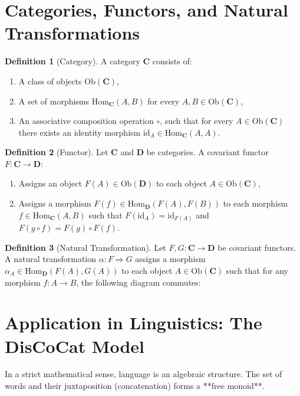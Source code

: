 \documentclass[11pt,a4paper,oneside]{book}
\theoremstyle{definition}
\newtheorem{definition}{Definition}[chapter]
\theoremstyle{plain}
\newcommand{\Cat}[1]{\mathbf{#1}}
\newcommand{\Hom}{\text{Hom}}
\newcommand{\id}{\text{id}}
\begin{document}
\section{Categories, Functors, and Natural Transformations}

\begin{definition}[Category]
A category $\Cat{C}$ consists of:
\begin{enumerate}
    \item A class of objects $\text{Ob}(\Cat{C})$,
    \item A set of morphisms $\Hom_{\Cat{C}}(A, B)$ for every $A, B \in \text{Ob}(\Cat{C})$,
    \item An associative composition operation $\circ$, such that for every $A \in \text{Ob}(\Cat{C})$ there exists an identity morphism $\id_A \in \Hom_{\Cat{C}}(A, A)$.
\end{enumerate}
\end{definition}

\begin{definition}[Functor]
Let $\Cat{C}$ and $\Cat{D}$ be categories. A covariant functor $F: \Cat{C} \to \Cat{D}$:
\begin{enumerate}
    \item Assigns an object $F(A) \in \text{Ob}(\Cat{D})$ to each object $A \in \text{Ob}(\Cat{C})$,
    \item Assigns a morphism $F(f) \in \Hom_{\Cat{D}}(F(A), F(B))$ to each morphism $f \in \Hom_{\Cat{C}}(A, B)$ such that $F(\id_A) = \id_{F(A)}$ and $F(g \circ f) = F(g) \circ F(f)$.
\end{enumerate}
\end{definition}

\begin{definition}[Natural Transformation]
Let $F, G: \Cat{C} \to \Cat{D}$ be covariant functors. A natural transformation $\alpha: F \Rightarrow G$ assigns a morphism $\alpha_A \in \Hom_{\Cat{D}}(F(A), G(A))$ to each object $A \in \text{Ob}(\Cat{C})$ such that for any morphism $f: A \to B$, the following diagram commutes:
\begin{center}
\end{center}
\end{definition}

\section{Application in Linguistics: The DisCoCat Model}
In a strict mathematical sense, language is an algebraic structure. The set of words and their juxtaposition (concatenation) forms a **free monoid**.
\end{document}
